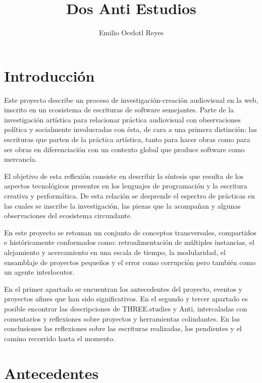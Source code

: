 \documentclass[12pt,letterpaper, twoside, openright,
headinclude,footinclude,BCOR5mm,
numbers=noenddot,cleardoublepage=empty,
tablecaptionabove]{article}
\author{Emilio Ocelotl Reyes}
\title{Dos Anti Estudios}
\begin{document}
\maketitle

\section*{Introducción}

Este proyecto describe un proceso de investigación-creación audiovisual en la web, inscrito en un ecosistema de escrituras de software semejantes. Parte de la investigación artística para relacionar práctica audiovisual con observaciones política y socialmente involucradas con ésta, de cara a una primera distinción: las escrituras que parten de la práctica artística, tanto para hacer obras como para ser obras en diferenciación con un contexto global que produce software como mercancía. 

El objetivo de esta reflexión consiste en describir la síntesis que resulta de los aspectos tecnológicos presentes en los lenguajes de programación y la escritura creativa y performática. De esta relación se desprende el espectro de prácticas en las cuales se inscribe la investigación, las piezas que la acompañan y algunas observaciones del ecosistema circundante. 

En este proyecto se retoman un conjunto de conceptos transversales, compartidos e históricamente conformados como: retroalimentación de múltiples instancias, el alejamiento y acercamiento en una escala de tiempo, la modularidad, el ensamblaje de proyectos pequeños y el error como corrupción pero también como un agente interlocutor. 

En el primer apartado se encuentran los antecedentes del proyecto, eventos y proyectos afines que han sido significativos. En el segundo y tercer apartado es posible encontrar las descripciones de THREE.studies y Anti, intercaladas con comentarios y reflexiones sobre proyectos y herramientas colindantes. En las conclusiones las reflexiones sobre las escrituras realizadas, los pendientes y el camino recorrido hasta el momento. 

\section*{Antecedentes}

\end{document}
